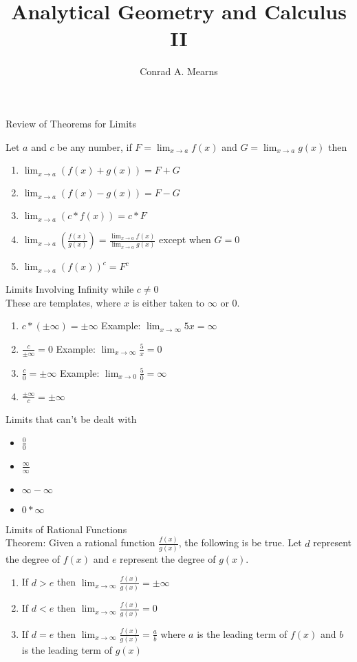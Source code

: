 \documentclass{article}
\title{Analytical Geometry and Calculus II}
\author{Conrad A. Mearns}
\begin{document}
\maketitle

\noindent
\Large
Review of Theorems for Limits\\
\normalsize

\noindent
Let $a$ and $c$ be any number, if $F = \lim_{x \to a}f(x)$ and $G = \lim_{x \to a}g(x)$ then

\begin{enumerate}
  \item $\lim_{x \to a}(f(x) + g(x)) = F + G$
  \item $\lim_{x \to a}(f(x) - g(x)) = F - G$
  \item $\lim_{x \to a}(c * f(x)) = c * F$
  \item $\lim_{x \to a}(\frac{f(x)}{g(x)}) = \frac{\lim_{x \to a}f(x)}{\lim_{x \to a}g(x)}$ except when $G = 0$
  \item $\lim_{x \to a}(f(x))^c = F^c$
\end{enumerate}

\noindent
\Large
Limits Involving Infinity while $c \neq 0$\\
\normalsize
\noindent
These are templates, where $x$ is either taken to $\infty$ or 0.

\begin{enumerate}
  \item $c * (\pm \infty) = \pm \infty$ Example: $\lim_{x \to \infty}5x = \infty$
  \item $\frac{c}{\pm \infty} = 0$ Example: $\lim_{x \to \infty}\frac{5}{x} = 0$
  \item $\frac{c}{0} = \pm \infty$ Example: $\lim_{x \to 0}\frac{5}{0} = \infty$
  \item $\frac{\pm \infty}{c} = \pm \infty$
\end{enumerate}

\noindent
\Large
Limits that can't be dealt with
\normalsize
\noindent
\begin{itemize}
  \item $\frac{0}{0}$
  \item $\frac{\infty}{\infty}$
  \item $\infty - \infty$
  \item $0 * \infty$
\end{itemize}

\noindent
\Large
Limits of Rational Functions\\
\normalsize
\noindent
Theorem: Given a rational function $\frac{f(x)}{g(x)}$, the following is be true.
Let $d$ represent the degree of $f(x)$ and $e$ represent the degree of $g(x)$.\\
\begin{enumerate}
  \item If $d > e$ then $\lim_{x \to \infty}\frac{f(x)}{g(x)} = \pm \infty$
  \item If $d < e$ then $\lim_{x \to \infty}\frac{f(x)}{g(x)} = 0$
  \item If $d = e$ then $\lim_{x \to \infty}\frac{f(x)}{g(x)} = \frac{a}{b}$ where $a$ is the leading term of $f(x)$ and $b$ is the leading term of $g(x)$
\end{enumerate}
\end{document}
